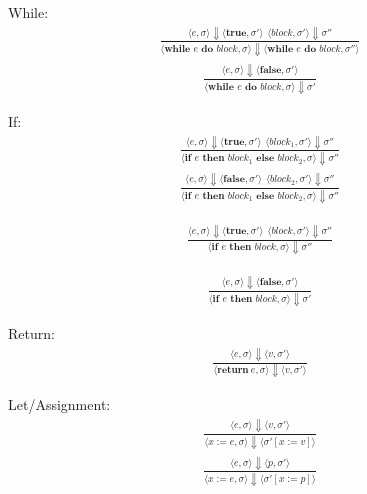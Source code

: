 \documentclass[12pt]{article}
\begin{document}
	
	While:
	\begin{align*}
		\frac{\langle e, \sigma \rangle\Downarrow \langle \textbf{true}, \sigma' \rangle \ \
		\langle block, \sigma' \rangle\Downarrow \sigma''}
		{\langle \textbf{while } e \textbf{ do } block, \sigma \rangle\Downarrow \langle \textbf{while } e \textbf{ do } block, \sigma'' \rangle}
	\end{align*}
	\begin{align*}
		\frac{\langle e, \sigma \rangle\Downarrow \langle \textbf{false}, \sigma' \rangle}
		{\langle \textbf{while } e \textbf{ do } block, \sigma \rangle\Downarrow \sigma'}
	\end{align*}

	If:
	\begin{align*}
		\frac{\langle e, \sigma \rangle\Downarrow \langle \textbf{true}, \sigma' \rangle \ \
		\langle block_1, \sigma' \rangle\Downarrow \sigma''}
		{\langle \textbf{if } e \textbf{ then } block_1 \textbf{ else } block_2, \sigma \rangle\Downarrow \sigma''}
	\end{align*}
	\begin{align*}
		\frac{\langle e, \sigma \rangle\Downarrow \langle \textbf{false}, \sigma' \rangle \ \
		\langle block_2, \sigma' \rangle\Downarrow \sigma''}
		{\langle \textbf{if } e \textbf{ then } block_1 \textbf{ else } block_2, \sigma \rangle\Downarrow \sigma''}
	\end{align*}
	
	\begin{align*}
		\frac{\langle e, \sigma \rangle\Downarrow \langle \textbf{true}, \sigma' \rangle \ \ 
		\langle block, \sigma' \rangle\Downarrow \sigma''}
		{\langle \textbf{if } e \textbf{ then } block, \sigma \rangle\Downarrow \sigma''}
	\end{align*}

	\begin{align*}
		\frac{\langle e, \sigma \rangle\Downarrow \langle \textbf{false}, \sigma' \rangle}
		{\langle \textbf{if } e \textbf{ then } block, \sigma \rangle\Downarrow \sigma'}
	\end{align*}


	Return:
	\begin{align*}
		\frac{\langle e, \sigma \rangle\Downarrow \langle v, \sigma' \rangle}
		{\langle \textbf{return}\ e, \sigma \rangle\Downarrow \langle v, \sigma' \rangle}
	\end{align*}

	Let/Assignment:
	\begin{align*}
		\frac{\langle e, \sigma \rangle\Downarrow \langle v, \sigma' \rangle}
		{\langle x := e, \sigma \rangle\Downarrow \langle \sigma' [x := v] \rangle}
	\end{align*}
	\begin{align*}
		\frac{\langle e, \sigma \rangle\Downarrow \langle p, \sigma' \rangle}
		{\langle x := e, \sigma \rangle\Downarrow \langle \sigma' [x := p] \rangle}
	\end{align*}
\end{document}
